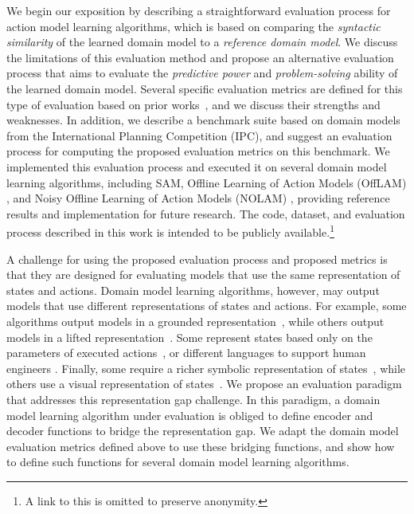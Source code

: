 \documentclass{article}
\theoremstyle{definition}
\theoremstyle{remark}
\newcommand{\sam}{\ac{SAM}\xspace}
\newif\ifaddcomments
\newcommand{\roni}[1]{\ifaddcomments{\textcolor{red}{[Roni: #1]}}\fi}
\begin{document}
We begin our exposition by describing a straightforward evaluation process for action model learning algorithms, which is based on comparing the \emph{syntactic similarity} of the learned domain model to a \emph{reference domain model}. We discuss the limitations of this evaluation method and propose an alternative evaluation process that aims to evaluate the \emph{predictive power} and \emph{problem-solving} ability of the learned domain model. 
Several specific evaluation metrics are defined for this type of evaluation based on prior works~\citep{aineto2019learning,juba2021safe,mordoch2024safe,Oswald2024DLLMDomainModeling}, and we discuss their strengths and weaknesses. 
In addition, we describe a benchmark suite  based on domain models from the International Planning Competition (IPC), 
and suggest an evaluation process for 
computing the proposed evaluation metrics on this benchmark.  
We implemented this evaluation process and executed it on several domain model learning algorithms, including \sam \citep{juba2021safe}, Offline Learning of Action Models (OffLAM) \citep{LAMANNA2025104256}, and Noisy Offline Learning of Action Models (NOLAM) \citep{Lamanna24}, providing reference results and implementation for future research. The code, dataset, and evaluation process described in this work is intended to be publicly available.\footnote{A link to this is omitted to preserve anonymity.} 


A challenge for using the proposed evaluation process and proposed metrics is that they are designed for evaluating models that use the same representation of states and actions. 
Domain model learning algorithms, however, may output models that use different representations of states and actions. 
For example, some algorithms output models in a grounded representation~\citep{stern2017efficient}, while others output models in a lifted representation~\citep{juba2021safe,xi2024neuro,LAMANNA2025104256}. 
Some represent states based only on the parameters of executed actions~\citep{cresswell2011generalised}, or different languages to support human engineers \citep{mccluskey2010action}. 
Finally, some require a richer symbolic representation of states~\citep{juba2021safe, Lamanna24}, while others use a visual representation of states~\citep{asai2022classical, xi2024neuro}.
We propose an evaluation paradigm that addresses this representation gap challenge. 
In this paradigm, a domain model learning algorithm under evaluation is obliged to define encoder and decoder functions to bridge the representation gap. 
We adapt the domain model evaluation metrics defined above to use these bridging functions, 
and show how to define such functions for several domain model learning algorithms. 
\end{document}
